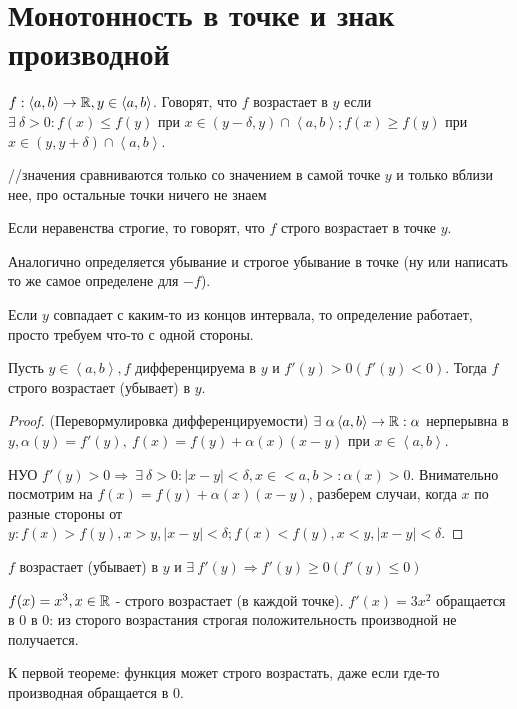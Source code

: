\documentclass[12pt]{report}
\begin{document}
\section{Монотонность в точке и знак производной}

\begin{defn}
$f: \left<a, b\right> \to \mathbb{R}, y \in \left<a, b\right>$. Говорят, что $f$ возрастает в $y$ если $\exists ~\delta > 0: f(x) \le f(y)$ при $x \in (y - \delta, y) \cap \left<a, b\right>; f(x) \ge f(y)$ при $x \in (y, y + \delta) \cap \left<a, b\right>$.

//значения сравниваются только со значением в самой точке $y$ и только вблизи нее, про остальные точки ничего не знаем

Если неравенства строгие, то говорят, что $f$ строго возрастает в точке $y$.

Аналогично определяется убывание и строгое убывание в точке (ну или написать то же самое определене для $-f$).

Если $y$ совпадает с каким-то из концов интервала, то определение работает, просто требуем что-то с одной стороны.
\end{defn}

\begin{thm}
Пусть $y \in \left<a, b\right>, f$ дифференцируема в $y$ и $f'(y) > 0 (f'(y) < 0)$. Тогда $f$ строго возрастает (убывает) в $y$.
\end{thm}
\begin{proof}
(Перевормулировка дифференцируемости) $\exists ~\alpha \left<a, b\right> \to \mathbb{R}: \alpha$ нерперывна в $y, \alpha(y) = f'(y), ~f(x) = f(y) + \alpha(x)(x - y)$ при $x \in \left<a, b\right>$. 

НУО $f'(y) > 0 \Rightarrow ~\exists ~\delta > 0: |x - y| < \delta, x \in <a, b>: \alpha(x) > 0$. Внимательно посмотрим на $f(x) = f(y) + \alpha(x)(x - y)$, разберем случаи, когда $x$ по разные стороны от $y: f(x) > f(y), x > y, |x - y| < \delta; f(x) < f(y), x < y, |x - y| < \delta$. 
\end{proof}

\begin{thm}
$f$ возрастает (убывает) в $y$ и $\exists ~f'(y) \Rightarrow f'(y) \ge 0 (f'(y) \le 0)$
\end{thm}

\begin{ex}
$f(x) = x^3, x \in \mathbb{R}$ - строго возрастает (в каждой точке). $f'(x) = 3x^2$ обращается в $0$ в $0$: из сторого возрастания строгая положительность производной не получается.

К первой теореме: функция может строго возрастать, даже если где-то производная обращается в $0$.
\end{ex}
\end{document}
